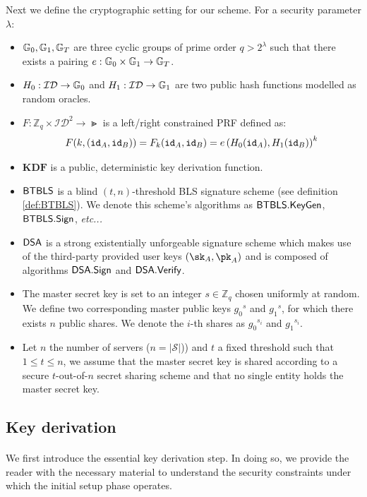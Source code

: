 		\noindent Next we define the cryptographic setting for our scheme. For a security parameter $\lambda$:
		\begin{itemize}
			\item $\mathbb{G}_0, \mathbb{G}_1, \mathbb{G}_T$ are three cyclic groups of prime order $q > 2^{\lambda}$ such that there exists a pairing $e : \mathbb{G}_0 \times \mathbb{G}_1 \rightarrow \mathbb{G}_T$.
			\item $H_0: \mathcal{ID}\rightarrow \mathbb{G}_0$  and $H_1: \mathcal{ID} \rightarrow \mathbb{G}_1$ are two public hash functions modelled as random oracles.
			\item $F: \mathbb{Z}_q \times \mathcal{ID}^2  \rightarrow \Gt$ is a left/right constrained PRF defined as: \begin{equation}
				F(k, (\mathtt{id}_A, \mathtt{id}_B)) = F_k(\mathtt{id}_A, \mathtt{id}_B)= e\left(H_0(\mathtt{id}_A), H_1(\mathtt{id}_B) \right)^k
			\end{equation}
			\item $\mathbf{KDF}$ is a public, deterministic key derivation function.
			\item $\mathsf{BTBLS}$ is a blind $(t,n)$-threshold BLS signature scheme (see definition \autoref{def:BTBLS}). We denote this scheme's algorithms as $\mathsf{BTBLS} . \mathsf{KeyGen}$, $\mathsf{BTBLS} . \mathsf{Sign}$, \textit{etc...} 
			\item $\mathsf{DSA}$ is a strong existentially unforgeable signature scheme which makes use of the third-party provided user keys $(\sk_A,\pk_A)$ and is composed of algorithms $\mathsf{DSA} . \mathsf{Sign}$ and $\mathsf{DSA} . \mathsf{Verify}$.
			\item The master secret key is set to an integer $s \in \mathbb{Z}_q$ chosen uniformly at random. We define two corresponding master public keys ${g_0}^s$ and ${g_1}^s$, for which there exists $n$ public shares. We denote the $i$-th shares as ${g_0}^{s_i}$ and ${g_1}^{s_i}$.
			\item Let $n$ the number of servers ($n=|\mathcal{S}|$)) and $t$ a fixed threshold such that $1 \leq t \leq n$, we assume that the master secret key is shared according to a secure $t$-out-of-$n$ secret sharing scheme and that no single entity holds the master secret key.
		\end{itemize}

	\subsection{Key derivation}
	
		\paragraph{} We first introduce the essential key derivation step. In doing so, we provide the reader with the necessary material to understand the security constraints under which the initial setup phase operates.
		
